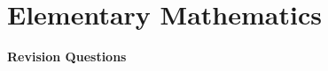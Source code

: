 \documentclass[12pt]{article}
\begin{document}
\section*{Elementary Mathematics}

{\bf \LARGE Revision Questions}

\end{document}
